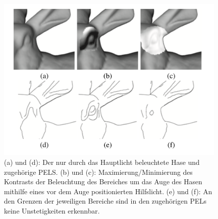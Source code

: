 \documentclass{paperStyle}
\begin{document}
\begin{figure}
	\centering
		\includegraphics[width=0.7\linewidth]{rabbit.png}
	\caption{(a) und (d): Der nur durch das Hauptlicht beleuchtete Hase und zugehörige PELS. (b) und (c): Maximierung/Minimierung des Kontrasts der Beleuchtung des Bereiches um das Auge des Hasen mithilfe eines vor dem Auge positionierten Hilfslicht. (e) und (f): An den Grenzen der jeweiligen Bereiche sind in den zugehörigen PELs keine Unstetigkeiten erkennbar.}
	\label{fig:rabbit}
\end{figure}
\end{document}
